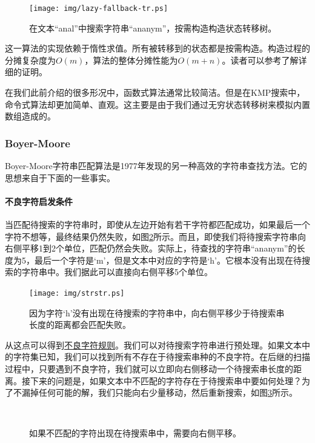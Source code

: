 \documentclass[UTF8]{article}
\begin{document}
\begin{figure}[htbp]
 \centering
 \texttt{[image: img/lazy-fallback-tr.ps]}
 \caption{在文本“anal”中搜索字符串“ananym”，按需构造构造状态转移树。}
 \label{fig:lazy-fallback-tree}
\end{figure}

这一算法的实现依赖于惰性求值。所有被转移到的状态都是按需构造。构造过程的分摊复杂度为$O(m)$，算法的整体分摊性能为$O(m+n)$。读者可以参考\cite{fp-pearls}了解详细的证明。

在我们此前介绍的很多形况中，函数式算法通常比较简洁。但是在KMP搜索中，命令式算法却更加简单、直观。这主要是由于我们通过无穷状态转移树来模拟内置数组造成的。

\subsubsection{Boyer-Moore}

Boyer-Moore字符串匹配算法是1977年发现的另一种高效的字符串查找方法\cite{boyer-moore}。它的思想来自于下面的一些事实。

\paragraph{不良字符启发条件}

当匹配待搜索的字符串时，即使从左边开始有若干字符都匹配成功，如果最后一个字符不想等，最终结果仍然失败，如图\ref{fig:bad-char}所示。而且，即使我们将待搜索字符串向右侧平移1到2个单位，匹配仍然会失败。实际上，待查找的字符串“ananym”的长度为5，最后一个字符是‘m’，但是文本中对应的字符是‘h’。它根本没有出现在待搜索的字符串中。我们据此可以直接向右侧平移5个单位。

\begin{figure}[htbp]
 \centering
 \texttt{[image: img/strstr.ps]}
 \caption{因为字符‘h’没有出现在待搜索的字符串中，向右侧平移少于待搜索串长度的距离都会匹配失败。}
 \label{fig:bad-char}
\end{figure}

从这点可以得到\underline{不良字符规则}。我们可以对待搜索字符串进行预处理。如果文本中的字符集已知，我们可以找到所有不存在于待搜索串种的不良字符。在后继的扫描过程中，只要遇到不良字符，我们就可以立即向右侧移动一个待搜索串长度的距离。接下来的问题是，如果文本中不匹配的字符存在于待搜索串中要如何处理？为了不漏掉任何可能的解，我们只能向右少量移动，然后重新搜索，如图\ref{fig:good-char}所示。

\begin{figure}[htbp]
 \centering
  \\
 \caption{如果不匹配的字符出现在待搜索串中，需要向右侧平移。}
 \label{fig:good-char}
\end{figure}
\end{document}
